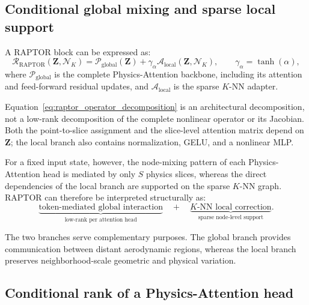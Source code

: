 \documentclass[a4paper,fleqn]{cas-sc}
\begin{document}
\subsection{Conditional global mixing and sparse local support}
\label{subsec:operator_decomposition}

A RAPTOR block can be expressed as:
\begin{equation}
    \mathcal R_{\mathrm{RAPTOR}}
    \left(
        \mathbf Z,\mathcal N_K
    \right)
    =
    \mathcal P_{\mathrm{global}}(\mathbf Z)
    +
    \gamma_{\alpha}
    \mathcal A_{\mathrm{local}}
    \left(
        \mathbf Z,\mathcal N_K
    \right),
    \qquad
    \gamma_{\alpha}=\tanh(\alpha),
    \label{eq:raptor_operator_decomposition}
\end{equation}
where \(\mathcal P_{\mathrm{global}}\) is the complete Physics-Attention backbone, including its attention and feed-forward residual updates, and \(\mathcal A_{\mathrm{local}}\) is the sparse \(K\)-NN adapter.

Equation~\eqref{eq:raptor_operator_decomposition} is an architectural decomposition, not a low-rank decomposition of the complete nonlinear operator or its Jacobian. Both the point-to-slice assignment and the slice-level attention matrix depend on \(\mathbf Z\); the local branch also contains normalization, GELU, and a nonlinear MLP.

For a fixed input state, however, the node-mixing pattern of each Physics-Attention head is mediated by only \(S\) physics slices, whereas the direct dependencies of the local branch are supported on the sparse \(K\)-NN graph. RAPTOR can therefore be interpreted structurally as:
\begin{equation}
    \underbrace{
        \text{token-mediated global interaction}
    }_{\text{low-rank per attention head}}
    \quad+\quad
    \underbrace{
        \text{\(K\)-NN local correction}
    }_{\text{sparse node-level support}}.
    \label{eq:structural_interpretation}
\end{equation}

The two branches serve complementary purposes. The global branch provides communication between distant aerodynamic regions, whereas the local branch preserves neighborhood-scale geometric and physical variation.

\subsection{Conditional rank of a Physics-Attention head}
\label{subsec:rank_property}
\end{document}
